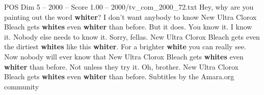 \begin{textsample}{POS Dim 5 – 2000 – Score 1.00 – 2000/tv\_com\_2000\_72.txt}  \label{ex:f5_pos_067}
Hey, why are you painting out the word \textbf{whiter}?
I don't want anybody to know New Ultra Clorox Bleach gets \textbf{whites} even \textbf{whiter} than before.
But it does.
You know it.
I know it.
Nobody else needs to know it.
Sorry, fellas.
New Ultra Clorox Bleach gets even the dirtiest \textbf{whites} like this \textbf{whiter}.
For a brighter \textbf{white} you can really see.
Now nobody will ever know that New Ultra Clorox Bleach gets \textbf{whites} even \textbf{whiter} than before.
Not unless they try it.
Oh, brother.
New Ultra Clorox Bleach gets \textbf{whites} even \textbf{whiter} than before.
Subtitles by the Amara.org community

\end{textsample}
